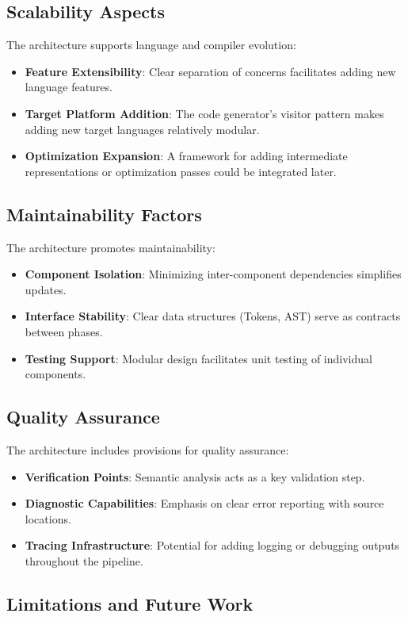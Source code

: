 \documentclass[conference]{IEEEtran}
\begin{document}
\subsection{Scalability Aspects}
The architecture supports language and compiler evolution:
\begin{itemize}
    \item \textbf{Feature Extensibility}: Clear separation of concerns facilitates adding new language features.
    \item \textbf{Target Platform Addition}: The code generator's visitor pattern makes adding new target languages relatively modular.
    \item \textbf{Optimization Expansion}: A framework for adding intermediate representations or optimization passes could be integrated later.
\end{itemize}

\subsection{Maintainability Factors}
The architecture promotes maintainability:
\begin{itemize}
    \item \textbf{Component Isolation}: Minimizing inter-component dependencies simplifies updates.
    \item \textbf{Interface Stability}: Clear data structures (Tokens, AST) serve as contracts between phases.
    \item \textbf{Testing Support}: Modular design facilitates unit testing of individual components.
\end{itemize}

\subsection{Quality Assurance}
The architecture includes provisions for quality assurance:
\begin{itemize}
    \item \textbf{Verification Points}: Semantic analysis acts as a key validation step.
    \item \textbf{Diagnostic Capabilities}: Emphasis on clear error reporting with source locations.
    \item \textbf{Tracing Infrastructure}: Potential for adding logging or debugging outputs throughout the pipeline.
\end{itemize}


\subsection{Limitations and Future Work} %
\end{document}
